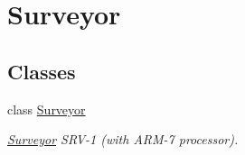 \hypertarget{group__driver__surveyor}{
\section{Surveyor}
\label{group__driver__surveyor}
}
\subsection*{Classes}
\begin{CompactItemize}
\item 
class \hyperlink{classSurveyor}{Surveyor}
\begin{CompactList}\small\item\em \hyperlink{classSurveyor}{Surveyor} SRV-1 (with ARM-7 processor). \item\end{CompactList}\end{CompactItemize}
